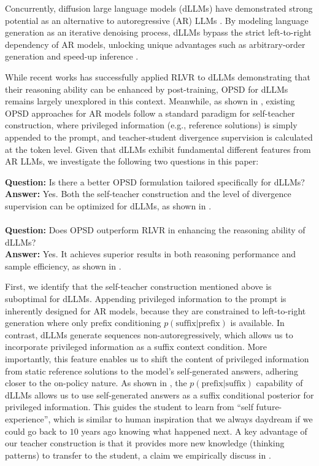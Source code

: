 \documentclass{llmxive}
\providecommand{\twoquestion}[4]{\begin{tcolorbox}[
    enhanced,
    colback=white,
    colframe=white,
    leftrule=0.4mm,
    rightrule=0.4mm,
    toprule=0.4mm,
    bottomrule=0.4mm,
    arc=0mm,
    left=0pt,
    right=0pt,
    top=2pt,
    bottom=2pt,
    breakable,
    borderline north={0.4mm}{0pt}{myblue},
    borderline south={0.4mm}{0pt}{myblue}
]
{\textbf{Question:}} #1 \\
{\textbf{Answer:}} #2 \\
\\
{\textbf{Question:}} #3 \\
{\textbf{Answer:}} #4
\end{tcolorbox}
}
\begin{document}
Concurrently, diffusion large language models (dLLMs) \citep{ou2024your, nie2025large, ye2025dream, cheng2025sdar, bie2025llada2} have demonstrated strong potential as an alternative to autoregressive (AR) LLMs \citep{jaech2024openai, xiao2026mimo}. By modeling language generation as an iterative denoising process, dLLMs bypass the strict left-to-right dependency of AR models, unlocking unique advantages such as arbitrary-order generation and speed-up inference \citep{khanna2025mercury, song2025seed, wu2025fast}.

While recent works \citep{zhao2025d1, tang2025wd1, xie2025step} has successfully applied RLVR to dLLMs demonstrating that their reasoning ability can be enhanced by post-training, OPSD for dLLMs remains largely unexplored in this context. Meanwhile, as shown in , existing OPSD approaches for AR models follow a standard paradigm for self-teacher construction, where privileged information (e.g., reference solutions) is simply appended to the prompt, and teacher-student divergence supervision is calculated at the token level. Given that dLLMs exhibit fundamental different features from AR LLMs, we investigate the following two questions in this paper:

\twoquestion{Is there a better OPSD formulation tailored specifically for dLLMs?}{Yes. Both the self-teacher construction and the level of divergence supervision can be optimized for dLLMs, as shown in \Cref{fig2}.}
{Does OPSD outperform RLVR in enhancing the reasoning ability of dLLMs?}{Yes. It achieves superior results in both reasoning performance and sample efficiency, as shown in \Cref{fig1}.}

First, we identify that the self-teacher construction mentioned above is suboptimal for dLLMs. Appending privileged information to the prompt is inherently designed for AR models, because they are constrained to left-to-right generation where only prefix conditioning $p(\text{suffix} | \text{prefix})$ is available. In contrast, dLLMs generate sequences non-autoregressively, which allows us to incorporate privileged information as a suffix context condition. More importantly, this feature enables us to shift the content of privileged information from static reference solutions to the model's self-generated answers, adhering closer to the on-policy nature. As shown in , the $p(\text{prefix} | \text{suffix})$ capability of dLLMs allows us to use self-generated answers as a suffix conditional posterior for privileged information. This guides the student to learn from ``self future-experience'', which is similar to human inspiration that we always daydream if we could go back to $10$ years ago knowing what happened next. A key advantage of our teacher construction is that it provides more new knowledge (thinking patterns) to transfer to the student, a claim we empirically discuss in .
\end{document}
